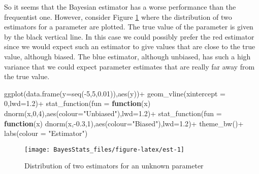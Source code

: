 \documentclass[
]{book}
\newenvironment{Shaded}{\begin{snugshade}}{\end{snugshade}}
\newcommand{\AttributeTok}[1]{\textcolor[rgb]{0.77,0.63,0.00}{#1}}
\newcommand{\ControlFlowTok}[1]{\textcolor[rgb]{0.13,0.29,0.53}{\textbf{#1}}}
\newcommand{\DecValTok}[1]{\textcolor[rgb]{0.00,0.00,0.81}{#1}}
\newcommand{\FloatTok}[1]{\textcolor[rgb]{0.00,0.00,0.81}{#1}}
\newcommand{\FunctionTok}[1]{\textcolor[rgb]{0.00,0.00,0.00}{#1}}
\newcommand{\NormalTok}[1]{#1}
\newcommand{\SpecialCharTok}[1]{\textcolor[rgb]{0.00,0.00,0.00}{#1}}
\newcommand{\StringTok}[1]{\textcolor[rgb]{0.31,0.60,0.02}{#1}}
\begin{document}
So it seems that the Bayesian estimator has a worse performance than the frequentist one. However, consider Figure \ref{fig:est} where the distribution of two estimators for a parameter are plotted. The true value of the parameter is given by the black vertical line. In this case we could possibly prefer the red estimator since we would expect such an estimator to give values that are close to the true value, although biased. The blue estimator, although unbiased, has such a high variance that we could expect parameter estimates that are really far away from the true value.

\begin{Shaded}
\begin{Highlighting}[]
\FunctionTok{ggplot}\NormalTok{(}\FunctionTok{data.frame}\NormalTok{(}\AttributeTok{y=}\FunctionTok{seq}\NormalTok{(}\SpecialCharTok{{-}}\DecValTok{5}\NormalTok{,}\DecValTok{5}\NormalTok{,}\FloatTok{0.01}\NormalTok{)),}\FunctionTok{aes}\NormalTok{(y))}\SpecialCharTok{+}
  \FunctionTok{geom\_vline}\NormalTok{(}\AttributeTok{xintercept =} \DecValTok{0}\NormalTok{,}\AttributeTok{lwd=}\FloatTok{1.2}\NormalTok{)}\SpecialCharTok{+}
  \FunctionTok{stat\_function}\NormalTok{(}\AttributeTok{fun =} \ControlFlowTok{function}\NormalTok{(x) }\FunctionTok{dnorm}\NormalTok{(x,}\DecValTok{0}\NormalTok{,}\DecValTok{4}\NormalTok{),}\FunctionTok{aes}\NormalTok{(}\AttributeTok{colour=}\StringTok{"Unbiased"}\NormalTok{),}\AttributeTok{lwd=}\FloatTok{1.2}\NormalTok{)}\SpecialCharTok{+}
   \FunctionTok{stat\_function}\NormalTok{(}\AttributeTok{fun =} \ControlFlowTok{function}\NormalTok{(x) }\FunctionTok{dnorm}\NormalTok{(x,}\SpecialCharTok{{-}}\FloatTok{0.3}\NormalTok{,}\DecValTok{1}\NormalTok{),}\FunctionTok{aes}\NormalTok{(}\AttributeTok{colour=}\StringTok{"Biased"}\NormalTok{),}\AttributeTok{lwd=}\FloatTok{1.2}\NormalTok{)}\SpecialCharTok{+} 
  \FunctionTok{theme\_bw}\NormalTok{()}\SpecialCharTok{+} \FunctionTok{labs}\NormalTok{(}\AttributeTok{colour =} \StringTok{"Estimator"}\NormalTok{)}
\end{Highlighting}
\end{Shaded}

\begin{figure}

{\centering \texttt{[image: BayesStats\_files/figure-latex/est-1]} 

}

\caption{Distribution of two estimators for an unknown parameter}\label{fig:est}
\end{figure}
\end{document}
